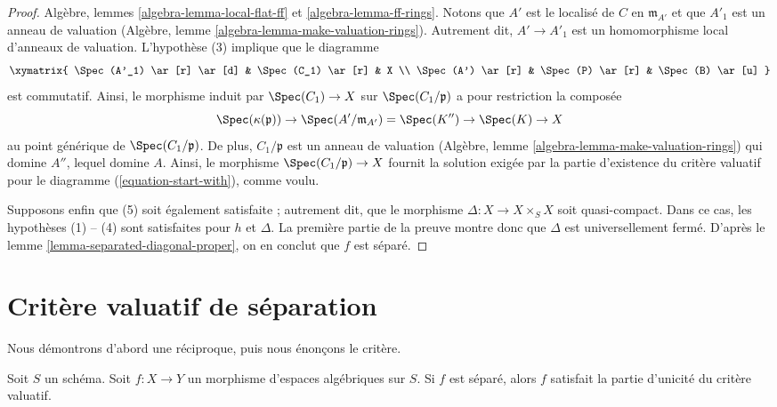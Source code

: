 \begin{proof}
Algèbre, lemmes \ref{algebra-lemma-local-flat-ff} et
\ref{algebra-lemma-ff-rings}.
Notons que $A'$ est le localisé de $C$ en $\mathfrak m_{A'}$
et que $A'_1$ est un anneau de valuation
(Algèbre, lemme \ref{algebra-lemma-make-valuation-rings}).
Autrement dit, $A' \to A'_1$ est un homomorphisme local d'anneaux de
valuation. L'hypothèse (3) implique que le diagramme
$$
\xymatrix{
\Spec(A'_1) \ar[r] \ar[d] & \Spec(C_1) \ar[r] & X \\
\Spec(A') \ar[r] & \Spec(P) \ar[r] & \Spec(B) \ar[u]
}
$$
est commutatif. Ainsi, le morphisme induit par $\Spec(C_1) \to X$
sur $\Spec(C_1/\mathfrak p)$ a pour restriction la composée
$$
\Spec(\kappa(\mathfrak p)) \to
\Spec(A'/\mathfrak m_{A'}) = \Spec(K'') \to
\Spec(K) \to X
$$
au point générique de $\Spec(C_1/\mathfrak p)$. De plus,
$C_1/\mathfrak p$ est un anneau de valuation
(Algèbre, lemme \ref{algebra-lemma-make-valuation-rings})
qui domine $A''$, lequel domine $A$.
Ainsi, le morphisme $\Spec(C_1/\mathfrak p) \to X$ fournit la solution exigée par la
partie d'existence du critère valuatif pour le diagramme
(\ref{equation-start-with}), comme voulu.

\medskip\noindent
Supposons enfin que (5) soit également satisfaite ; autrement dit, que le morphisme
$\Delta : X \to X \times_S X$ soit quasi-compact. Dans ce cas,
les hypothèses (1) -- (4) sont satisfaites pour $h$ et $\Delta$. La première
partie de la preuve montre donc que $\Delta$ est universellement fermé.
D'après le lemme \ref{lemma-separated-diagonal-proper}, on en conclut que
$f$ est séparé.
\end{proof}

















\section{Critère valuatif de séparation}
\label{section-valuative-separatedness}

\noindent
Nous démontrons d'abord une réciproque, puis nous énonçons le critère.

\begin{lemma}
\label{lemma-separated-implies-valuative}
Soit $S$ un schéma.
Soit $f : X \to Y$ un morphisme d'espaces algébriques sur $S$.
Si $f$ est séparé, alors $f$ satisfait la partie
d'unicité du critère valuatif.
\end{lemma}


